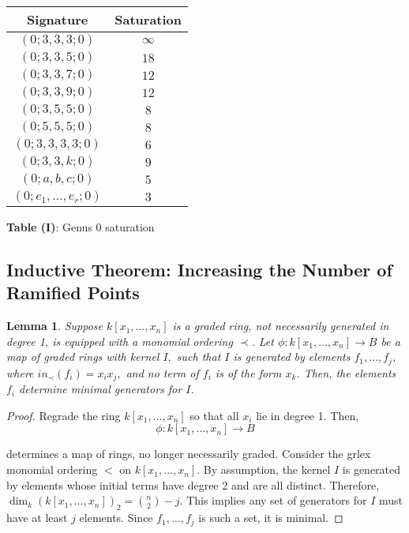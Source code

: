 \documentclass{amsart}
\theoremstyle{plain}
\newtheorem{lem}[thm]{Lemma}
\theoremstyle{definition}
\theoremstyle{remark}
\numberwithin{equation}{section}
\newcommand\ssec{\subsection}
\begin{document}

\begin{longtable}
	{| c | c |}
	\hline
	Signature & Saturation \\
	\hline
	\hline

	$(0; 3, 3, 3; 0)$ & $\infty$ \\	\hline

	$(0; 3, 3, 5; 0)$ & $18$ \\	\hline
	
	$(0; 3, 3, 7; 0)$ & $12$ \\	\hline
	
	$(0; 3, 3, 9; 0)$ & $12$ \\	\hline
	
	$(0; 3, 5, 5; 0)$ & $8$ \\	\hline
	
	$(0; 5, 5, 5; 0)$ & $8$ \\	\hline
	
	$(0; 3, 3, 3, 3; 0)$ & $6$ \\	\hline
	
	\hline
	
	$(0; 3, 3, k; 0)$ & $9$ \\	\hline
	
	$(0; a, b, c; 0)$ & $5$ \\	\hline
	
	$(0; e_1, \ldots, e_r; 0)$ & $3$ \\	\hline
\end{longtable}

\begin{center}
\textbf{Table (I)}: Genus 0 saturation
\end{center}

\ssec{Inductive Theorem: Increasing the Number of Ramified Points}
\label{ssec:g_0_ram_pts}

\begin{lem}
\label{lem:minimal_quadratic}
Suppose $k[x_1,\ldots, x_n]$ is a graded ring, not necessarily
generated in degree 1, is equipped with a monomial ordering $\prec$.
 Let $\phi:k[x_1,\ldots, x_n] \rightarrow B$ be a map of graded
rings with kernel $I,$ such that $I$ is generated by elements $f_1,
\ldots, f_j$, where $in_\prec(f_i) = x_ix_j,$ and no term of $f_i$
is of the form $x_k$. Then, the elements $f_i$ determine minimal
generators for $I$.
\end{lem}

\begin{proof}
Regrade the ring $k[x_1, \ldots, x_n]$ so that all $x_i$ lie in
degree 1. Then,
\[
	\phi : k[x_1, \ldots, x_n] \rightarrow B
\]

\noindent
determines a map of rings, no longer necessarily graded. Consider
the grlex monomial ordering $<$ on $k[x_1, \ldots, x_n]$.
By
assumption, the kernel $I$ is generated by elements whose initial
terms have degree 2 and are all distinct. Therefore, $\dim_k (k[x_1,
\ldots, x_n])_2 = \binom{n}{2}-j.$ This implies any set of
generators for $I$ must have at least $j$ elements. Since $f_1,
\ldots, f_j$ is such a set, it is minimal.
\end{proof}
\end{document}

